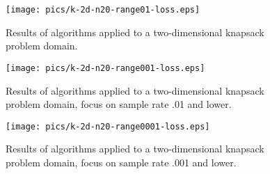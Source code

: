 

\begin{figure}
\begin{center}
\texttt{[image: pics/k-2d-n20-range01-loss.eps]}
\caption{Results of algorithms applied to a two-dimensional knapsack problem domain.}
\label{fig:knapsack-2d-range01-loss}
\end{center}
\end{figure}

\begin{figure}
\begin{center}
\texttt{[image: pics/k-2d-n20-range001-loss.eps]}
\caption{Results of algorithms applied to a two-dimensional knapsack problem domain, focus on sample rate .01 and lower.}
\label{fig:knapsack-2d-range001-loss}
\end{center}
\end{figure}

\begin{figure}
\begin{center}
\texttt{[image: pics/k-2d-n20-range0001-loss.eps]}
\caption{Results of algorithms applied to a two-dimensional knapsack problem domain, focus on sample rate .001 and lower.}
\label{fig:knapsack-2d-range0001-loss}
\end{center}
\end{figure}

